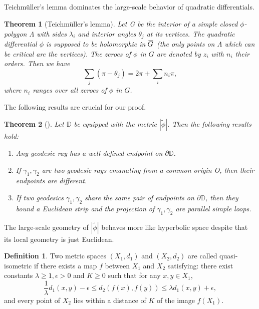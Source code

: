 \documentclass{amsart}
\newcommand{\closureit}[1]{\mkern 1.5mu \overline{\mkern-2.5mu#1\mkern-0.5mu}\mkern 1.5mu}  %
\theoremstyle{plain}
\newtheorem{Theorem}{Theorem}
\theoremstyle{definition}
\newtheorem{Definition}{Definition}[section]
\theoremstyle{remark}
\begin{document}
\subsection*{}
Teichm\"uller's lemma dominates the large-scale behavior of quadratic differentials.
\begin{Theorem}[Teichm\"uller's lemma] \label{teichmuller_lemma}
    Let G be the interior of a simple closed $\phi$-polygon $\Lambda$ with sides $\lambda_i$ and interior angles $\theta_j$ at its vertices.  The quadratic differential $\phi$ is supposed to be holomorphic in $\closureit{G}$ (the only points on $\Lambda$ which can be critical are the vertices).  The zeroes of $\phi$ in $G$ are denoted by $z_i$ with $n_i$ their orders.  Then we have
    \begin{equation*}
    \sum_j(\pi-\theta_j)=2\pi+\sum_in_i\pi, 
    \end{equation*}
    where $n_i$ ranges over all zeroes of $\phi$ in $G$.  
\end{Theorem}
The following results are crucial for our proof.  
\begin{Theorem}[\cite{MardenStrebel}] \label{marden_strebel}
    Let $\mathbb{D}$ be equipped with the metric $|\tilde{\phi}|$.  Then the following results hold:
    \begin{enumerate}
\item Any geodesic ray has a well-defined endpoint on $\partial \mathbb{D}$.
\item If $\gamma_1, \gamma_2$ are two geodesic rays emanating from a common origin O, then their endpoints are different.  
        \item If two geodesics $\gamma_1, \gamma_2$ share the same pair of endpoints on $\partial \mathbb{D}$, then they bound a Euclidean strip and the projection of $\gamma_1, \gamma_2$ are parallel simple loops.  
    \end{enumerate}
\end{Theorem}
% 
The large-scale geometry of $|\tilde{\phi}|$ behaves more like hyperbolic space despite that its local geometry is just Euclidean.  
% 
\begin{Definition}
    Two metric spaces $(X_1,d_1)$ and $(X_2,d_2)$ are called quasi-isometric if there exists a map $f$ between $X_1$ and $X_2$ satisfying: there exist constants $\lambda \ge 1, \epsilon > 0$ and $K\ge 0$ such that for any $x, y \in X_1$, 
    \begin{equation*}
    \frac{1}{\lambda}d_1(x, y) - \epsilon \le d_2(f(x), f(y)) \le \lambda d_1(x, y) + \epsilon ,
    \end{equation*}
    and every point of $X_2$ lies within a distance of $K$ of the image $f(X_1)$.  
\end{Definition}
\end{document}
